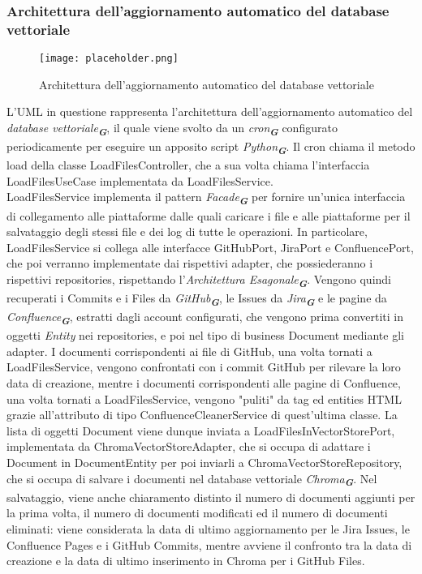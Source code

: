 \newpage


\subsubsection{Architettura dell'aggiornamento automatico del database vettoriale}
\label{sec:architettura_aggiornamento_database_vettoriale}

\begin{figure}[h]
    \centering
    \texttt{[image: placeholder.png]}
    \caption{Architettura dell'aggiornamento automatico del database vettoriale}
\end{figure}

L'UML in questione rappresenta l'architettura dell'aggiornamento automatico del \emph{database vettoriale}\textsubscript{\textbf{\textit{G}}}, il quale viene svolto da un \emph{cron}\textsubscript{\textbf{\textit{G}}} configurato periodicamente per eseguire un apposito script \emph{Python}\textsubscript{\textbf{\textit{G}}}. Il cron chiama il metodo load della classe LoadFilesController, che a sua volta chiama l'interfaccia LoadFilesUseCase implementata da LoadFilesService.\\
LoadFilesService implementa il pattern \emph{Facade}\textsubscript{\textbf{\textit{G}}} per fornire un'unica interfaccia di collegamento alle piattaforme dalle quali caricare i file e alle piattaforme per il salvataggio degli stessi file e dei log di tutte le operazioni. In particolare, LoadFilesService si collega alle interfacce GitHubPort, JiraPort e ConfluencePort, che poi verranno implementate dai rispettivi adapter, che possiederanno i rispettivi repositories, rispettando l'\emph{Architettura Esagonale}\textsubscript{\textbf{\textit{G}}}. Vengono quindi recuperati i Commits e i Files da \emph{GitHub}\textsubscript{\textbf{\textit{G}}}, le Issues da \emph{Jira}\textsubscript{\textbf{\textit{G}}} e le pagine da \emph{Confluence}\textsubscript{\textbf{\textit{G}}}, estratti dagli account configurati, che vengono prima convertiti in oggetti \emph{Entity} nei repositories, e poi nel tipo di business Document mediante gli adapter. I documenti corrispondenti ai file di GitHub, una volta tornati a LoadFilesService, vengono confrontati con i commit GitHub per rilevare la loro data di creazione, mentre i documenti corrispondenti alle pagine di Confluence, una volta tornati a LoadFilesService, vengono "puliti" da tag ed entities HTML grazie all'attributo di tipo ConfluenceCleanerService di quest'ultima classe. La lista di oggetti Document viene dunque inviata a LoadFilesInVectorStorePort, implementata da ChromaVectorStoreAdapter, che si occupa di adattare i Document in DocumentEntity per poi inviarli a ChromaVectorStoreRepository, che si occupa di salvare i documenti nel database vettoriale \emph{Chroma}\textsubscript{\textbf{\textit{G}}}. Nel salvataggio, viene anche chiaramento distinto il numero di documenti aggiunti per la prima volta, il numero di documenti modificati ed il numero di documenti eliminati: viene considerata la data di ultimo aggiornamento per le Jira Issues, le Confluence Pages e i GitHub Commits, mentre avviene il confronto tra la data di creazione e la data di ultimo inserimento in Chroma per i GitHub Files. \\
